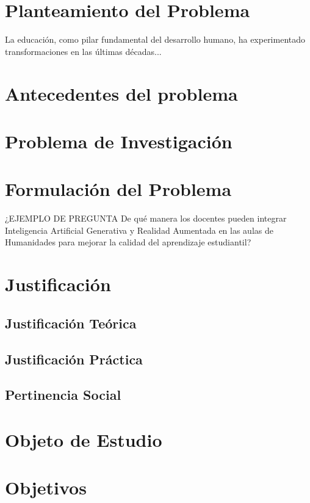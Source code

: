 \documentclass[12pt,oneside,letterpaper]{book}
\begin{document}
\section{Planteamiento del Problema}
La educación, como pilar fundamental del desarrollo humano, ha experimentado transformaciones en las últimas décadas...

\section{Antecedentes del problema}
\lipsum[1]

\section{Problema de Investigación}
\lipsum[1]

\section{Formulación del Problema}
¿EJEMPLO DE PREGUNTA De qué manera los docentes pueden integrar Inteligencia Artificial Generativa y Realidad Aumentada en las aulas de Humanidades para mejorar la calidad del aprendizaje estudiantil?

\section{Justificación}
\lipsum[1]

\subsection{Justificación Teórica}
\lipsum[1]

\subsection{Justificación Práctica}
\lipsum[1]

\subsection{Pertinencia Social}
\lipsum[1]

\section{Objeto de Estudio}
\lipsum[1]

\section{Objetivos}
\lipsum[1]
\end{document}
